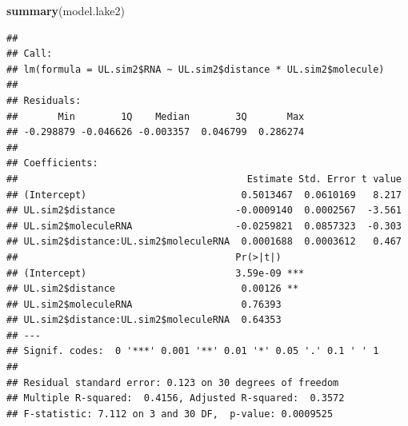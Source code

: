\documentclass[]{article}
\newenvironment{Shaded}{\begin{snugshade}}{\end{snugshade}}
\newcommand{\KeywordTok}[1]{\textcolor[rgb]{0.13,0.29,0.53}{\textbf{#1}}}
\newcommand{\NormalTok}[1]{#1}
\begin{document}
\begin{Shaded}
\begin{Highlighting}[]
\KeywordTok{summary}\NormalTok{(model.lake2)}
\end{Highlighting}
\end{Shaded}

\begin{verbatim}
## 
## Call:
## lm(formula = UL.sim2$RNA ~ UL.sim2$distance * UL.sim2$molecule)
## 
## Residuals:
##       Min        1Q    Median        3Q       Max 
## -0.298879 -0.046626 -0.003357  0.046799  0.286274 
## 
## Coefficients:
##                                        Estimate Std. Error t value
## (Intercept)                           0.5013467  0.0610169   8.217
## UL.sim2$distance                     -0.0009140  0.0002567  -3.561
## UL.sim2$moleculeRNA                  -0.0259821  0.0857323  -0.303
## UL.sim2$distance:UL.sim2$moleculeRNA  0.0001688  0.0003612   0.467
##                                      Pr(>|t|)    
## (Intercept)                          3.59e-09 ***
## UL.sim2$distance                      0.00126 ** 
## UL.sim2$moleculeRNA                   0.76393    
## UL.sim2$distance:UL.sim2$moleculeRNA  0.64353    
## ---
## Signif. codes:  0 '***' 0.001 '**' 0.01 '*' 0.05 '.' 0.1 ' ' 1
## 
## Residual standard error: 0.123 on 30 degrees of freedom
## Multiple R-squared:  0.4156, Adjusted R-squared:  0.3572 
## F-statistic: 7.112 on 3 and 30 DF,  p-value: 0.0009525
\end{verbatim}
\end{document}
